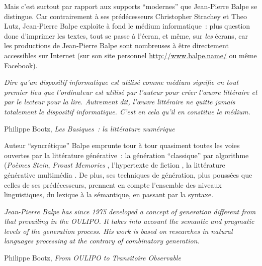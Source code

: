 \documentclass{article}
\newenvironment{citationbox}
{\begin{center}
		\begin{minipage}{.8\textwidth}
		}
		{
		\end{minipage}	
\end{center}
}
\begin{document}
			Mais c'est surtout par rapport aux supports ``modernes'' que Jean-Pierre Balpe se distingue. Car contrairement à ses prédécesseurs Christopher Strachey et Theo Lutz, Jean-Pierre Balpe exploite à fond le médium informatique~: plus question donc d'imprimer les textes, tout se passe à l'écran, et même, sur \textit{les} écrans, car les productions de Jean-Pierre Balpe sont nombreuses à être directement accessibles sur Internet (sur son site personnel \href{http://www.balpe.name/}{http://www.balpe.name/} ou même Facebook).
			\begin{citationbox}
				\textit{Dire qu’un dispositif informatique est utilisé comme médium signifie en tout premier lieu que l’ordinateur est utilisé par l’auteur pour créer l’œuvre littéraire et par le lecteur pour la lire. Autrement dit, l’œuvre littéraire ne quitte jamais totalement le dispositif informatique. C’est en cela qu’il en constitue le médium.}
				\begin{flushright}
					Philippe Bootz, \textit{Les Basiques~: la littérature numérique} \cite{bootz2006}
				\end{flushright}
			\end{citationbox}
			Auteur ``syncrétique'' Balpe emprunte tour à tour quasiment toutes les voies ouvertes par la littérature générative~: la génération ``classique'' par algorithme (\textit{Poèmes Stein}\cite{balpe_stein}, \textit{Proust Memories} \cite{balpe_proust}, l'hypertexte de fiction \cite{balpe_disparition}, la littérature générative multimédia \cite{balpe_videoseries}. De plus, ses techniques de génération, plus poussées que celles de ses prédécesseurs, prennent en compte l'ensemble des niveaux linguistiques, du lexique à la sémantique, en passant par la syntaxe.
			\begin{citationbox}
				\textit{Jean-Pierre Balpe has since 1975 developed a concept of generation different from that prevailing in the OULIPO. It takes into account the semantic and pragmatic levels of the generation process. His work is based on researches in natural languages processing at the contrary of combinatory generation.}
				\begin{flushright}
					Philippe Bootz, \textit{From OULIPO to Transitoire Observable} \cite{bootz2012}
				\end{flushright}
			\end{citationbox}
			
\end{document}
